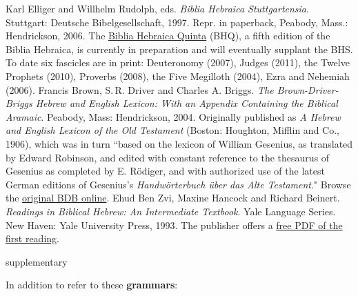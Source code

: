 \documentclass[titlepage]{article}
\begin{document}
\begingroup
\renewcommand{\section}[2]{}%
\begin{thebibliography}{Ben Zvi}%
    Karl Elliger and Willhelm Rudolph, eds. \emph{Biblia Hebraica
    Stuttgartensia}. Stutt\-gart: Deut\-sche Bi\-bel\-ge\-sell\-schaft,
    1997. Repr. in paperback, Peabody, Mass.: Hendrickson, 2006. The
    \href{http://www.academic-bible.com/en/home/current-projects/biblia-hebraica-quinta-bhq/}%
    {Biblia Hebraica Quinta} (BHQ), a fifth edition of the Biblia
    Hebraica, is currently in preparation and will eventually supplant
    the BHS. To date six fascicles are in print:
        Deuteronomy (2007),
        Judges (2011),
        the Twelve Prophets (2010),
        Proverbs (2008),
        the Five Megilloth (2004),
        Ezra and Nehemiah (2006).
    Francis Brown, S.\,R. Driver and Charles A. Briggs. \emph{The
    Brown-Driver-Briggs Hebrew and English Lexicon: With an Appendix
    Containing the Biblical Aramaic}. Peabody, Mass: Hendrickson, 2004.
    Originally published as \emph{A Hebrew and English Lexicon of the
    Old Testament} (Boston: Houghton, Mifflin and Co., 1906), which was
    in turn ``based on the lexicon of William Gesenius, as translated by
    Edward Robinson, and edited with constant reference to the thesaurus
    of Gesenius as completed by E. Rödiger, and with authorized use of
    the latest German editions of Gesenius's \emph{Handwörterbuch über
    das Alte Testament}." Browse the
    \href{https://archive.org/details/hebrewenglishlex00geseuoft}{original BDB online}.
    Ehud Ben Zvi, Maxine Hancock and Richard Beinert. \emph{Readings in
    Biblical Hebrew: An Intermediate Textbook}. Yale Language Series.
    New Haven: Yale University Press, 1993. The publisher offers a
    \href{http://yalepress.yale.edu/yupbooks/languages/pdf/Zvi_excerpt.pdf}%
    {free PDF of the first reading}.
\end{thebibliography}
\endgroup

\section{Supplementary Texts}
\label{supplementary}

In addition to \cite{bz} refer to these \textbf{grammars}:
\end{document}
